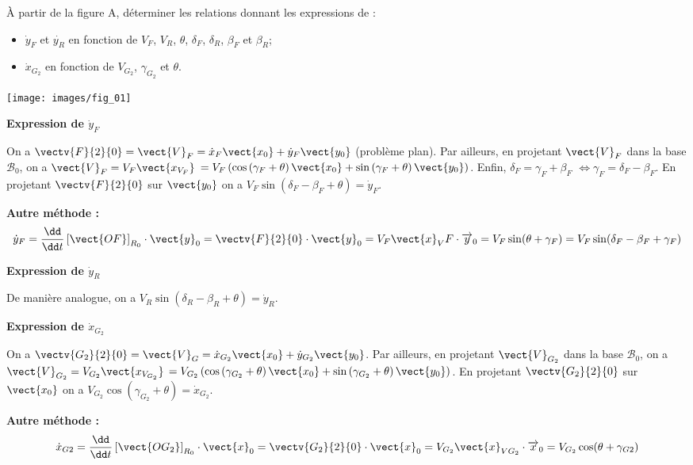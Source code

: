 \documentclass[11pt]{article}
\begin{document}
\UPSTIquestion* À partir de la figure A, déterminer les relations donnant les expressions de :
\begin{itemize}
\item $\dot{y}_F$ et $\dot{y_R}$ en fonction de $V_F$, $V_R$, $\theta$, $\delta_F$, $\delta_R$, $\beta_F$ et $\beta_R$;
\item $\dot{x}_{G_2}$ en fonction de $V_{G_2}$, $\gamma_{G_2}$ et $\theta$.
\end{itemize}

\begin{UPSTIcorrige}

\begin{center}
\texttt{[image: images/fig\_01]}
\end{center}
\textbf{Expression de $\dot{y}_F$}

On a  $\vectv{F}{2}{0}=\vect{V}_F = \dot{x}_F \vect{x_0} +\dot{y}_F \vect{y_0}$ (problème plan).  
Par ailleurs, en projetant $\vect{V}_F $ dans la base $\mathcal{B}_0$, on a $\vect{V}_F =V_F\vect{x_{V_F}}$ 
$=V_F\left(\cos\left(\gamma_F +\theta \right)\vect{x_0}+\sin\left(\gamma_F +\theta \right)\vect{y_0}\right)$. Enfin, $\delta_F=\gamma_F+\beta_F$ $\Leftrightarrow \gamma_F = \delta_F-\beta_F  $. 
En projetant  $\vectv{F}{2}{0}$ sur $\vect{y_0}$ on a $V_F\sin\left(\delta_F-\beta_F +\theta \right) = \dot{y}_F $.

\textbf{Autre méthode : }
$$
\dot{y}_F=\dfrac{\dd }{\dd t}\left[\vect{OF}\right]_{R_0}\cdot \vect{y}_0=\vectv{F}{2}{0}\cdot \vect{y}_0=V_F\vect{x}_VF\cdot \overrightarrow{y}_0=V_F\sin(\theta+\gamma_F)=V_F\sin(\delta_F-\beta_F+\gamma_F)
$$

\textbf{Expression de $\dot{y}_R$}

De manière analogue, on a $V_R \sin\left(\delta_R-\beta_R +\theta \right) = \dot{y}_R $.

\textbf{Expression de $\dot{x}_{G_2}$}

On a  $\vectv{G_2}{2}{0}=\vect{V}_G = \dot{x}_{G_2} \vect{x_0} +\dot{y}_{G_2} \vect{y_0}$.  
Par ailleurs, en projetant $\vect{V}_{G_2} $ dans la base $\mathcal{B}_0$, on a $\vect{V}_{G_2} =V_{G_2}\vect{x_{V_{G_2}}}$ 
$=V_{G_2}\left(\cos\left(\gamma_{G_2} +\theta \right)\vect{x_0}+\sin\left(\gamma_{G_2} +\theta \right)\vect{y_0}\right)$. 
En projetant  $\vectv{{G_2}}{2}{0}$ sur $\vect{x_0}$ on a $V_{G_2}\cos\left(\gamma_{G_2} +\theta \right) = \dot{x}_{G_2} $.


\textbf{Autre méthode : }
$$
\dot{x}_{G2}=\dfrac{\dd }{\dd t}\left[\vect{OG_2}\right]_{R_0}\cdot \vect{x}_0=\vectv{G_2}{2}{0}\cdot \vect{x}_0=V_{G_2}\vect{x}_{VG_2}\cdot \overrightarrow{x}_0=V_{G_2}\cos(\theta+\gamma_{G2})$$

\end{UPSTIcorrige}
\end{document}
